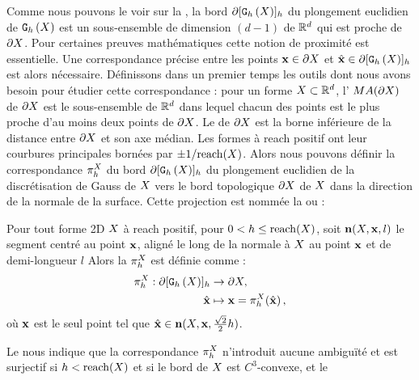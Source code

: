 Comme nous pouvons le voir sur la , la bord
$\partial\lbrack \mathtt{G}_{h}\left(X\right) \rbrack_{h}$ du plongement euclidien de $\mathtt{G}_{h}\left(X\right)$ est un sous-ensemble
de dimension $(d-1)$ de $\mathbb{R}^d$ qui est proche de $\partial X$. Pour
certaines preuves mathématiques cette notion de proximité est essentielle. Une
correspondance précise entre les points $\mathbf{x} \in \partial X$ et $\hat{\mathbf{x}}\in
\partial\lbrack \mathtt{G}_{h}\left(X\right) \rbrack_{h}$ est alors nécessaire. Définissons dans un premier temps
les outils dont nous avons besoin pour étudier cette correspondance : pour un
forme $X \subset \mathbb{R}^d$, l' $MA(\partial X)$ de $\partial X$ est le
sous-ensemble de $\mathbb{R}^d$ dans lequel chacun des points est le plus proche d'au
moins deux points de $\partial X$. Le  de $\partial X$ est la borne
inférieure de la distance entre $\partial X$ et son axe médian. Les formes à reach
positif ont leur courbures principales bornées par $\pm 1 / \mathrm{reach}(X)$.
%
%
Alors nous pouvons définir la correspondance $\pi_h^{X}$ du bord
$\partial\lbrack \mathtt{G}_{h}\left(X\right) \rbrack_{h}$ du plongement euclidien de la discrétisation de Gauss
de $X$ vers le bord topologique $\partial X$ de $X$ dans la direction de la
normale de la surface. Cette projection est nommée la  ou  \cite{Lachaud2006HDR} :
%
\begin{definition}{}
\label{def:projection}
%
  Pour tout forme 2D $X$ à reach positif, pour $0 < h \le \mathrm{reach}(X)$,
  soit $\mathbf{n}(X,\mathbf{x},l)$ le segment centré au point $\mathbf{x}$, aligné le
  long de la normale à $X$ au point $\mathbf{x}$ et de demi-longueur $l$ Alors la
   $\pi_h^{X}$ est définie comme :
  \begin{align}
    \pi_h^{X}: \partial\lbrack \mathtt{G}_{h}\left(X\right) \rbrack_{h} &\rightarrow \partial X, \nonumber \\
    \hat{\mathbf{x}} &\mapsto \mathbf{x}=\pi_h^{X}(\hat{\mathbf{x}}) \,,
  \end{align}
  où $\mathbf{x}$ est le seul point tel que $\hat{\mathbf{x}} \in
  \mathbf{n}(X,\mathbf{x},\frac{\sqrt{2}}{2}h)$.
%
\end{definition}
%
Le  nous indique que la correspondance $\pi_h^{X}$
n'introduit aucune ambiguïté et est surjectif si $h < \mathrm{reach}(X)$ et si le
bord de $X$ est $C^3$-convexe, et le 
